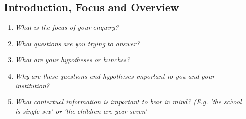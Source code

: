 \subsection{Introduction, Focus and Overview}
\begin{enumerate}
\item{\textit{What is the focus of your enquiry?}}
\item{\textit{What questions are you trying to answer?}}
\item{\textit{What are your hypotheses or hunches?}}
\item{\textit{Why are these questions and hypotheses important to you and your institution?}}
\item{\textit{What contextual information is important to bear in mind? (E.g. 'the school is single sex' or 'the children are year seven'}}
\end{enumerate}